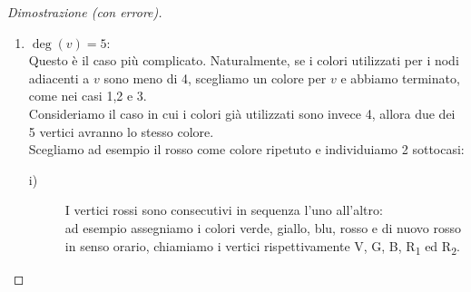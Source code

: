 \documentclass[a4paper,12pt,titlepage]{report}
\begin{document}
\begin{proof}[Dimostrazione (con errore)]
\begin{enumerate}
\begin{description}
\begin{figure}[h]
        			\vspace{0.5cm}
        			\caption{Inversione dei colori nella catena di Kempe rossa-verde (necessariamente non ciclica) contenente R. In questo modo $v$ può essere colorato di rosso.}
        		\end{figure}
        	\end{description}
        	\emph{Nota}: fino a questo punto la dimostrazione di Kempe non presenta alcun errore.
        	\item $\deg(v) = 5$:
        	\\Questo è il caso più complicato. Naturalmente, se i colori utilizzati per i nodi adiacenti a $v$ sono meno di 4, scegliamo un colore per $v$ e abbiamo terminato, come nei casi 1,2 e 3.
        	\\Consideriamo il caso in cui i colori già utilizzati sono invece 4, allora due dei 5 vertici avranno lo stesso colore.
        	\\Scegliamo ad esempio il rosso come colore ripetuto e individuiamo 2 sottocasi:
        	\begin{description}
        		\item[i)] I vertici rossi sono consecutivi in sequenza l'uno all'altro:
        		\\ad esempio assegniamo i colori verde, giallo, blu, rosso e di nuovo rosso in senso orario, chiamiamo i vertici rispettivamente V, G, B, R\textsubscript{1} ed R\textsubscript{2}.
        		\begin{figure}[h]
        			\centering
\end{figure}
\end{description}
\end{enumerate}
\end{proof}
\end{document}
